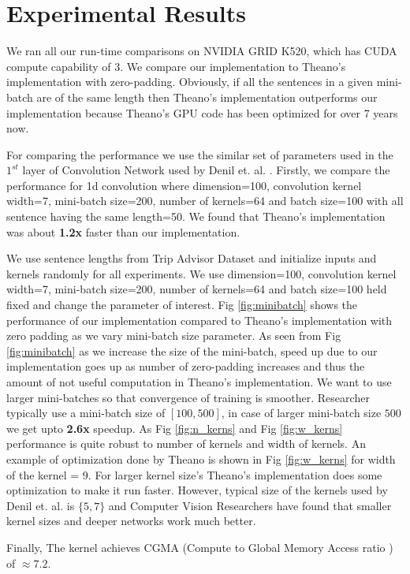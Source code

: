 \documentclass{article}
\begin{document}
\section*{Experimental Results}
We ran all our run-time comparisons on NVIDIA GRID K520, which has CUDA compute capability of 3. We compare our implementation to Theano's implementation with zero-padding. Obviously, if all the sentences in a given mini-batch are of the same length then Theano's implementation outperforms our implementation because Theano's GPU code has been optimized for over 7 years now. 

For comparing the performance we use the similar set of parameters used in the $1^{st}$ layer of Convolution Network used by Denil et. al. \cite{Denil2014c}. Firstly, we compare the performance for 1d convolution where dimension=100, convolution kernel width=7, mini-batch size=200, number of kernels=64 and batch size=100 with all sentence having the same length=50. We found that Theano's implementation was about \textbf{1.2x} faster than our implementation. 

We use sentence lengths from Trip Advisor Dataset and initialize inputs and kernels randomly for all experiments. We use dimension=100, convolution kernel width=7, mini-batch size=200, number of kernels=64 and batch size=100 held fixed and change the parameter of interest. 
Fig \ref{fig:minibatch} shows the performance of our implementation compared to Theano's implementation with zero padding as we vary mini-batch size parameter. As seen from Fig \ref{fig:minibatch} as we increase the size of the mini-batch, speed up due to our implementation goes up as number of zero-padding increases and thus the amount of not useful computation in Theano's implementation. We want to use larger mini-batches so that convergence of training is smoother. Researcher typically use a mini-batch size of $[100, 500]$, in case of larger mini-batch size $500$ we get upto \textbf{2.6x} speedup. As Fig \ref{fig:n_kerns} and Fig \ref{fig:w_kerns} performance is quite robust to number of kernels and width of kernels. An example of optimization done by Theano is shown in Fig \ref{fig:w_kerns} for width of the kernel = 9. For larger kernel size's Theano's implementation does some optimization to make it run faster. However, typical size of the kernels used by Denil et. al. \cite{Denil2014c} is $\{5, 7\}$ and Computer Vision Researchers have found that smaller kernel sizes and deeper networks work much better. 

Finally, The kernel achieves CGMA (Compute to Global Memory Access ratio ) of $\approx 7.2$.  
\end{document}

